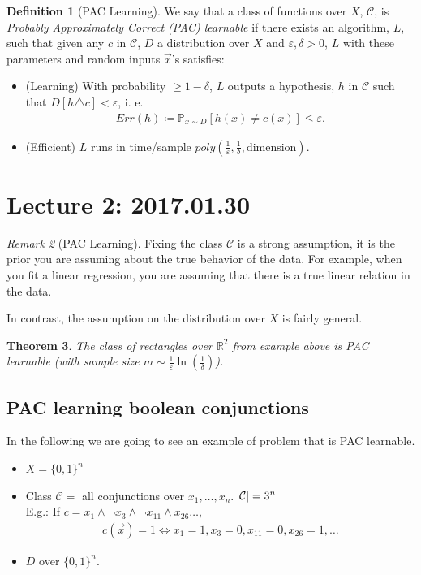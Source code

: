 \documentclass[12pt, letterpaper]{article}
\numberwithin{equation}{section} %
\newcommand{\R}{\mathbb{R}}
\newcommand{\mb}{\mathbb}
\newcommand{\mc}{\mathcal}
\newcommand{\ve}{\varepsilon}
\newtheorem{theorem}{Theorem}[section]
\theoremstyle{definition}
\newtheorem{definition}[theorem]{Definition}
\theoremstyle{remark}
\newtheorem{remark}[theorem]{Remark}
\begin{document}
\begin{definition}[PAC Learning]
	We say that a class of functions over $X$, $\mc C$, is \emph{Probably Approximately Correct (PAC) learnable} if there exists an algorithm, $L$, such that given any $c$ in $\mc C$, $D$ a distribution over $X$ and $\ve, \delta >0$, $L$ with these parameters and random inputs $\vec x$'s satisfies:  
	\begin{itemize}
		\item (Learning) With probability $\geq 1 -\delta$, $L$ outputs a hypothesis, $h$ in $\mc 
		C$ such that $D[h\triangle c]<\ve$, i. e.
		\begin{align}
    		Err(h) \coloneqq \mb P_{x\sim D}[h(x) \ne c(x)] \leq \ve.
		\end{align}
		\item (Efficient) $L$ runs in time/sample $poly\left(\frac1\ve, \frac1\delta, \textrm{dimension}\right)$.
	\end{itemize}
\end{definition}


\section{Lecture 2: 2017.01.30}

\begin{remark}[PAC Learning]
    Fixing the class $\mc C$ is a strong assumption, it is the prior you are assuming about the true behavior of the data.
     For example, when you fit a linear regression, you are assuming that there is a true linear relation in the data.
    
    In contrast, the assumption on the distribution over $X$ is fairly general.
\end{remark}

\begin{theorem}
    The class of rectangles over $\R^2$ from example above is PAC learnable (with sample size $m\sim\frac1\ve\ln\left(\frac1\delta\right)$).
\end{theorem}

\subsection{PAC learning boolean conjunctions}

In the following we are going to see an example of problem that is PAC learnable.
\begin{itemize}
    \item $X = \lbrace 0, 1 \rbrace^n$
    \item Class $\mc C = $ all conjunctions over $x_1,\ldots,x_n$. $\abs{\mc C} = 3^n$\\
          E.g.: If $c = x_1\wedge \lnot x_3 \wedge \lnot x_{11} \wedge x_{26} \ldots$,
          \begin{align}
              c(\vec x) = 1 \iff x_1 =1, x_3 = 0, x_{11} = 0, x_{26} = 1, \ldots
          \end{align}
    \item $D$ over $\lbrace 0, 1 \rbrace^n$.
\end{itemize}
\end{document}
